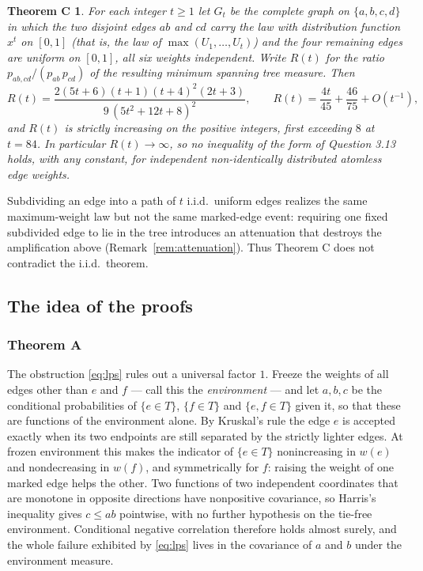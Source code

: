 \documentclass[10pt,a4paper]{amsart}
\newtheorem*{theoremC}{Theorem C}
\begin{document}
\begin{theoremC}
For each integer $t\ge1$ let $G_t$ be the complete graph on $\{a,b,c,d\}$ in which the two
disjoint edges $ab$ and $cd$ carry the law with distribution function $x^t$ on
$[0,1]$ (that is, the law of $\max(U_1,\dots,U_t)$) and the four remaining edges
are uniform on $[0,1]$, all six weights independent. Write $R(t)$ for the ratio
$p_{ab,cd}/(p_{ab}\,p_{cd})$ of the resulting minimum spanning tree measure.
Then
\[
R(t)=\frac{2(5t+6)(t+1)(t+4)^2(2t+3)}{9\,(5t^2+12t+8)^2},
\qquad
R(t)=\frac{4t}{45}+\frac{46}{75}+O(t^{-1}) ,
\]
and $R(t)$ is strictly increasing on the positive integers, first exceeding
$8$ at $t=84$. In particular $R(t)\to\infty$, so no inequality of the form of Question
3.13 holds, with any constant, for independent non-identically distributed
atomless edge weights.
\end{theoremC}

Subdividing an edge into a path of $t$ i.i.d.\ uniform edges realizes the same
maximum-weight law but not the same marked-edge event: requiring one fixed
subdivided edge to lie in the tree introduces an attenuation that destroys the
amplification above (Remark~\ref{rem:attenuation}). Thus Theorem C does not
contradict the i.i.d.\ theorem.

\subsection{The idea of the proofs}
\label{ssec:idea}

\subsubsection*{Theorem A}
The obstruction \eqref{eq:lps} rules out a universal factor $1$. Freeze
the weights of all edges other than $e$ and $f$ --- call this the
\emph{environment} --- and let $a,b,c$ be the conditional probabilities of
$\{e\in T\}$, $\{f\in T\}$ and $\{e,f\in T\}$ given it, so that these are
functions of the environment alone. By Kruskal's rule the edge $e$ is accepted
exactly when its two endpoints are still separated by the strictly lighter
edges. At frozen environment this makes the indicator of $\{e\in T\}$
nonincreasing in $w(e)$ and nondecreasing in $w(f)$, and symmetrically for $f$:
raising the weight of one marked edge helps the other. Two functions of two
independent coordinates that are monotone in opposite directions have
nonpositive covariance, so Harris's inequality gives $c\le ab$ pointwise, with
no further hypothesis on the tie-free environment. Conditional negative
correlation therefore holds almost surely, and the whole failure exhibited by \eqref{eq:lps}
lives in the covariance of $a$ and $b$ under the environment measure.
\end{document}
